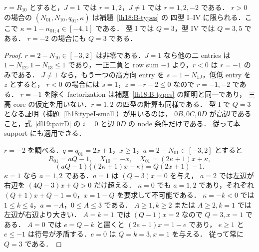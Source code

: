\begin{lemma}[標準 $B$ の接続]
\label{dl19:B-types}
$r=R_{10}$ とすると，$J=1$ では $r=1,2$，$J\ne1$ では $r=1,2,-2$ である．
$r>0$ の場合の $(N_{01},N_{10},q_{01},\kappa)$ は補題~\ref{lh18:B-types} の
四型 I--IV に限られる．ここで $\kappa=1-n_{01;4}\in[-4,1]$ である．
型 I では $Q=3$，型 IV では $Q=3,5$ である．
$r=-2$ の場合にも $Q=3$ である．
\end{lemma}
\begin{proof}
$r=2-N_{10}\in[-3,2]$ は非零である．$J=1$ なら他の二 entries は
$1-N_{12},1-N_{13}\le1$ であり，一正二負と row sum $-1$ より，$r<0$ は $r=-1$ のみである．
$J\ne1$ なら，もう一つの高方向 entry を $s=1-N_{1J}$，低低 entry を $z$ とすると，
$r<0$ の場合には $s=1$，$z=-r-2\le0$ なので $r=-1,-2$ である．
$r=-1$ を除く factorization は補題~\ref{lh18:B-types} の証明と同一であり，
三高 core の仮定を用いない．$r=1,2$ の四型の計算も同様である．
型 I で $Q=3$ となる証明（補題~\ref{lh18:typeI-small}）が用いるのは，
$0B,0C,0D$ が高辺であること，式~\eqref{dl19:pairD} の $i=0$ と辺 $0D$ の node 条件だけである．
従って本 support にも適用できる．

$r=-2$ を調べる．$q=q_{01}=2x+1$，$x\ge1$，$a=2-N_{01}\in[-3,2]$ とすると
\[
 R_{01}=aQ-1,\quad X_{10}=-x,\quad X_{01}=(2\kappa+1)x+\kappa,
\]
\begin{equation}\label{dl19:negative-two-factor}
 (aQ-1)\{(2\kappa+1)x+\kappa\}=Q(2x+1)-1.
\end{equation}
$\kappa=1$ なら $a=1,2$ である．$a=1$ は $(Q-3)x=0$ を与え，
$a=2$ では左辺が右辺を $(4Q-3)x+Q>0$ だけ超える．
$\kappa=0$ でも $a=1,2$ であり，それぞれ
$(Q+1)x+Q-1=0$，$x=1-Q$ を要求して不可能である．
$\kappa=-k<0$ では $1\le k\le4$，$a=-A$，$0\le A\le3$ である．
$A\ge1,k\ge2$ または $A\ge2,k=1$ では左辺が右辺より大きい．
$A=k=1$ では $(Q-1)x=2$ なので $Q=3,x=1$ である．
$A=0$ では $e=Q-k$ と置くと $(2e+1)x=1-e$ であり，
$e\ge1$ と $e\le-1$ は符号が矛盾する．$e=0$ は $Q=k=3,x=1$ を与える．
従って常に $Q=3$ である．
\end{proof}


